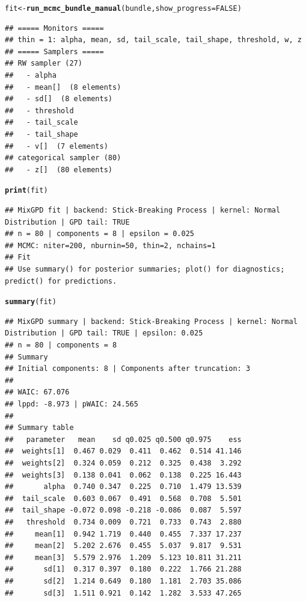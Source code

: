 \documentclass[article]{jss}\usepackage[]{graphicx}\usepackage[]{xcolor}
\makeatletter
\newcommand{\hlnum}[1]{\textcolor[rgb]{0.686,0.059,0.569}{#1}}%
\newcommand{\hldef}[1]{\textcolor[rgb]{0.345,0.345,0.345}{#1}}%
\newcommand{\hlkwb}[1]{\textcolor[rgb]{0.69,0.353,0.396}{#1}}%
\newcommand{\hlkwc}[1]{\textcolor[rgb]{0.333,0.667,0.333}{#1}}%
\newcommand{\hlkwd}[1]{\textcolor[rgb]{0.737,0.353,0.396}{\textbf{#1}}}%
\newenvironment{kframe}{%
 \def\at@end@of@kframe{}%
 \ifinner\ifhmode%
  \def\at@end@of@kframe{\end{minipage}}%
  \begin{minipage}{\columnwidth}%
 \fi\fi%
 \def\FrameCommand##1{\hskip\@totalleftmargin \hskip-\fboxsep
 \colorbox{shadecolor}{##1}\hskip-\fboxsep
     \hskip-\linewidth \hskip-\@totalleftmargin \hskip\columnwidth}%
 \MakeFramed {\advance\hsize-\width
   \@totalleftmargin\z@ \linewidth\hsize
   \@setminipage}}%
 {\par\unskip\endMakeFramed%
 \at@end@of@kframe}
\newenvironment{knitrout}{}{} %
\makeatother
\begin{document}
\begin{knitrout}
\begin{kframe}
\begin{alltt}
\hldef{fit} \hlkwb{<-} \hlkwd{run_mcmc_bundle_manual}\hldef{(bundle,} \hlkwc{show_progress} \hldef{=} \hlnum{FALSE}\hldef{)}
\end{alltt}
\begin{verbatim}
## ===== Monitors =====
## thin = 1: alpha, mean, sd, tail_scale, tail_shape, threshold, w, z
## ===== Samplers =====
## RW sampler (27)
##   - alpha
##   - mean[]  (8 elements)
##   - sd[]  (8 elements)
##   - threshold
##   - tail_scale
##   - tail_shape
##   - v[]  (7 elements)
## categorical sampler (80)
##   - z[]  (80 elements)
\end{verbatim}
\begin{alltt}
\hlkwd{print}\hldef{(fit)}
\end{alltt}
\begin{verbatim}
## MixGPD fit | backend: Stick-Breaking Process | kernel: Normal Distribution | GPD tail: TRUE
## n = 80 | components = 8 | epsilon = 0.025
## MCMC: niter=200, nburnin=50, thin=2, nchains=1 
## Fit
## Use summary() for posterior summaries; plot() for diagnostics; predict() for predictions.
\end{verbatim}
\begin{alltt}
\hlkwd{summary}\hldef{(fit)}
\end{alltt}
\begin{verbatim}
## MixGPD summary | backend: Stick-Breaking Process | kernel: Normal Distribution | GPD tail: TRUE | epsilon: 0.025
## n = 80 | components = 8
## Summary
## Initial components: 8 | Components after truncation: 3
## 
## WAIC: 67.076
## lppd: -8.973 | pWAIC: 24.565
## 
## Summary table
##   parameter   mean    sd q0.025 q0.500 q0.975    ess
##  weights[1]  0.467 0.029  0.411  0.462  0.514 41.146
##  weights[2]  0.324 0.059  0.212  0.325  0.438  3.292
##  weights[3]  0.138 0.041  0.062  0.138  0.225 16.443
##       alpha  0.740 0.347  0.225  0.710  1.479 13.539
##  tail_scale  0.603 0.067  0.491  0.568  0.708  5.501
##  tail_shape -0.072 0.098 -0.218 -0.086  0.087  5.597
##   threshold  0.734 0.009  0.721  0.733  0.743  2.880
##     mean[1]  0.942 1.719  0.440  0.455  7.337 17.237
##     mean[2]  5.202 2.676  0.455  5.037  9.817  9.531
##     mean[3]  5.579 2.976  1.209  5.123 10.811 31.211
##       sd[1]  0.317 0.397  0.180  0.222  1.766 21.288
##       sd[2]  1.214 0.649  0.180  1.181  2.703 35.086
##       sd[3]  1.511 0.921  0.142  1.282  3.533 47.265
\end{verbatim}
\end{kframe}
\end{knitrout}
\end{document}
